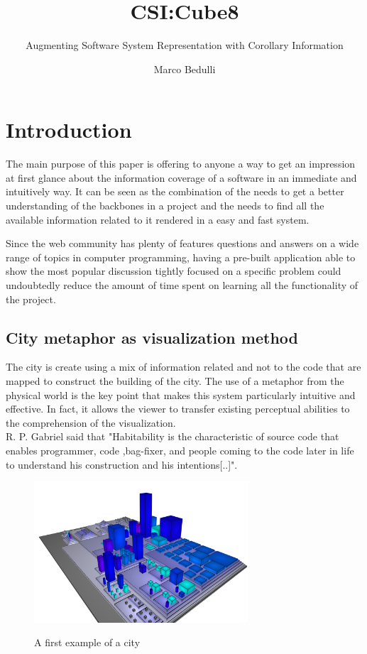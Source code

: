 \documentclass[]{usiinfbachelorproject}
\author{Marco Bedulli}
\title{CSI:Cube8}
\subtitle{Augmenting Software System Representation with Corollary Information}
\begin{document}
\maketitle
\tableofcontents

\pagebreak
\listoffigures

\pagebreak

\section{Introduction} \label{introduction}

The main purpose of this paper is offering to anyone a way to get an impression at first glance about the information coverage of a software in an immediate and intuitively way. It can be seen as the combination of the needs to get a better understanding of the backbones in a project and the needs to find all the available information related to it rendered in a easy and fast system.

Since the web community has plenty of features questions and answers on a wide range of topics in computer programming, having a pre-built application able to show the most popular discussion tightly focused on a specific problem could undoubtedly reduce the amount of time spent on learning all the functionality of the project.



\subsection{City metaphor as visualization method } 


The city is create using a mix of information related and not to the code that are mapped to construct the building of the city.
The use of a metaphor from the physical world is the key point that makes this system particularly intuitive and effective. In fact, it allows the viewer to transfer existing perceptual abilities to the comprehension of the visualization.\\
R. P. Gabriel \cite{gabry} said that "Habitability is the characteristic of source code that enables programmer, code ,bag-fixer, and people coming to the code later in life to understand his construction and his intentions[..]". 
\begin{figure}[h]
	\centering
\includegraphics[width=8cm]{images/city1}
\label {myO}
\caption{A first example of a city}
\end{figure}
\end{document}
